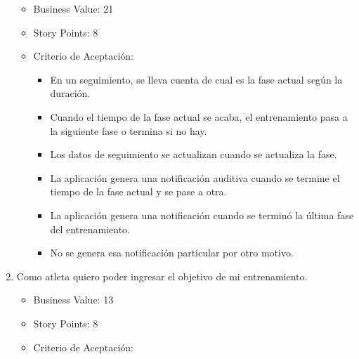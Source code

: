 \begin{enumerate}
  \begin{itemize}
  \itemsep1pt\parskip0pt
  \item
    Business Value: 21
  \item
    Story Points: 8
  \item
    Criterio de Aceptación:

    \begin{itemize}
    \itemsep1pt\parskip0pt
    \item
      En un seguimiento, se lleva cuenta de cual es la fase actual según
      la duración.
    \item
      Cuando el tiempo de la fase actual se acaba, el entrenamiento pasa
      a la siguiente fase o termina si no hay.
    \item
      Los datos de seguimiento se actualizan cuando se actualiza la
      fase.
    \item
      La aplicación genera una notificación auditiva cuando se termine
      el tiempo de la fase actual y se pase a otra.
    \item
      La aplicación genera una notificación cuando se terminó la última
      fase del entrenamiento.
    \item
      No se genera esa notificación particular por otro motivo.
    \end{itemize}
  \end{itemize}
\item
  Como atleta quiero poder ingresar el objetivo de mi entrenamiento.

  \begin{itemize}
  \itemsep1pt\parskip0pt
  \item
    Business Value: 13
  \item
    Story Points: 8
  \item
    Criterio de Aceptación:


\end{itemize}
\end{enumerate}
